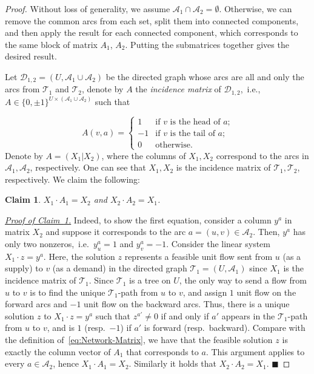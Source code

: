 \documentclass[11pt]{article}
\newtheorem{claim}[theorem]{Claim}
\begin{document}
\begin{proof}
    Without loss of generality, we assume $\mathcal{A}_1\cap\mathcal{A}_2=\emptyset$. Otherwise, we can remove the common arcs from each set, split them into connected components, and then apply the result for each connected component, which corresponds to the same block of matrix $A_1$, $A_2$. Putting the submatrices together gives the desired result.

Let $\mathcal{D}_{1,2}=(U,\mathcal{A}_1\cup\mathcal{A}_2)$ be the directed graph whose arcs are all and only the arcs from $\mathcal{T}_1$ and $\mathcal{T}_2$, denote by $A$ the \emph{incidence matrix} of $\mathcal{D}_{1,2}$,~i.e.,~$A\in\{0,\pm 1\}^{U\times (\mathcal{A}_1\cup\mathcal{A}_2)}$ such that

\begin{equation}\label{eq:Digraph-Matrix}
    A(v,a)=\left\{
    \begin{array}{cc}
        1 & \textrm{if $v$ is the head of $a$;}\\
        -1 & \textrm{if $v$ is the tail of $a$;} \\
        0 & \textrm{otherwise.}
    \end{array}
    \right.
\end{equation}
Denote by $A=(X_1|X_2)$, where the columns of $X_1,X_2$ correspond to the arcs in $\mathcal{A}_1,\mathcal{A}_2$, respectively. One can see that $X_1,X_2$ is the incidence matrix of $\mathcal{T}_1,\mathcal{T}_2$, respectively. We claim the following:

\begin{claim}\label{cl:invert}
    $X_1\cdot A_1=X_2$ and $X_2\cdot A_2=X_1$.
\end{claim}

\noindent \emph{\underline{Proof of Claim~\ref{cl:invert}.}} Indeed, to show the first equation, consider a column $y^a$ in matrix $X_2$ and suppose it corresponds to the arc $a=(u,v)\in \mathcal{A}_2$. Then, $y^a$ has only two nonzeros,~i.e.~$y^a_u=1$ and $y^a_v=-1$. Consider the linear system $X_1\cdot z=y^a$. Here, the solution $z$ represents a feasible unit flow sent from $u$ (as a supply) to $v$ (as a demand) in the directed graph $\mathcal{T}_1=(U,\mathcal{A}_1)$ since $X_1$ is the incidence matrix of $\mathcal{T}_1$. Since $\mathcal{T}_1$ is a tree on $U$, the only way to send a flow from $u$ to $v$ is to find the unique $\mathcal{T}_1$-path from $u$ to $v$, and assign $1$ unit flow on the forward arcs and $-1$ unit flow on the backward arcs. Thus, there is a unique solution $z$ to $X_1\cdot z=y^a$ such that $z^{a'}\neq 0$ if and only if $a'$ appears in the $\mathcal{T}_1$-path from $u$ to $v$, and is $1$ (resp.~$-1$) if $a'$ is forward (resp.~backward). Compare with the definition of~\eqref{eq:Network-Matrix}, we have that the feasible solution $z$ is exactly the column vector of $A_1$ that corresponds to $a$. This argument applies to every $a\in\mathcal{A}_2$, hence $X_1\cdot A_1=X_2$. Similarly it holds that $X_2\cdot A_2=X_1$. \hfill $  \blacksquare$ 


\end{proof}
\end{document}
